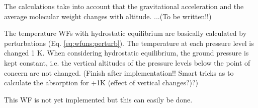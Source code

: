  The calculations take into account that the gravitational acceleration
 and the average molecular weight changes with altitude. ...(To be written!!)
 
 The temperature WFs with hydrostatic equilibrium are basically
 calculated by perturbations (Eq. \ref{eq:wfuns:perturb}). The
 temperature at each pressure level is changed 1 K.  When considering
 hydrostatic equilibrium, the ground pressure is kept constant, i.e.
 the vertical altitudes of the pressure levels below the point of
 concern are not changed. (Finish after implementation!! Smart tricks 
 as to calculate the absorption for +1K (effect of vertical changes?)?)



 \label{sec:wfuns:eground}
 
 This WF is not yet implemented but this can easily be done.


